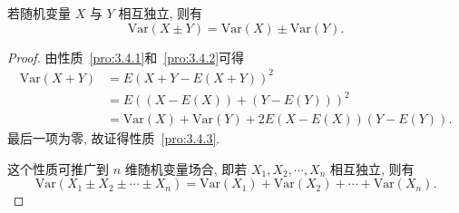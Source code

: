   \begin{property}\label{pro:3.4.3}
  	若随机变量 $X$ 与 $Y$ 相互独立, 则有
  	\begin{equation*}
  		\mathrm{Var}(X\pm Y)=\mathrm{Var}(X)\pm\mathrm{Var}(Y).
  	\end{equation*}
  	\begin{proof}
  		由性质~\ref{pro:3.4.1}和~\ref{pro:3.4.2}可得
  		\begin{align*}
  			\mathrm{Var}(X+Y)&=E(X+Y-E(X+Y))^2\\
  			&=E((X-E(X))+(Y-E(Y)))^2\\
  			&=\mathrm{Var}(X)+\mathrm{Var}(Y)+2E(X-E(X))(Y-E(Y)).
  		\end{align*}
  		最后一项为零, 故证得性质~\ref{pro:3.4.3}.
  		
  		这个性质可推广到 $n$ 维随机变量场合, 即若 $X_{1}, X_{2}, \cdots, X_{n}$ 相互独立, 则有
  		\begin{equation}
  			\mathrm{Var}\left(X_{1} \pm X_{2} \pm \cdots \pm X_{n}\right)=\mathrm{Var}\left(X_{1}\right)+\mathrm{Var}\left(X_{2}\right)+\cdots+\mathrm{Var}\left(X_{n}\right).
  		\end{equation}
  	\end{proof}
  \end{property}